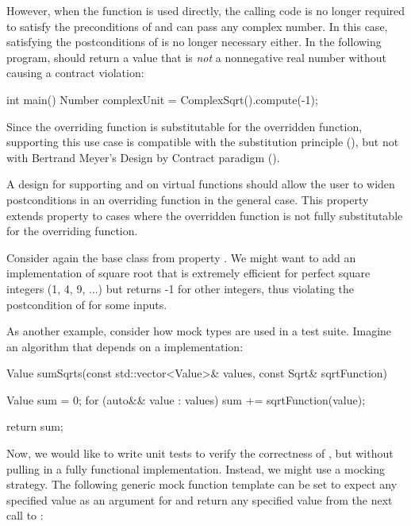 However, when the function  is used directly, the calling code is no longer required to satisfy the preconditions of  and can pass any complex number. In this case, satisfying the postconditions of  is no longer necessary either. In the following program,  should return a value that is \emph{not} a nonnegative real number without causing a contract violation:

\begin{codeblock}
int main() {
  Number complexUnit = ComplexSqrt().compute(-1);
}
\end{codeblock}

Since the overriding function is substitutable for the overridden function, supporting this use case is compatible with the substitution principle (), but not with Bertrand Meyer's Design by Contract paradigm ().


A design for supporting  and  on virtual functions should allow the user to widen postconditions in an overriding function in the general case. This property extends property  to cases where the overridden function is not fully substitutable for the overriding function. 

Consider again the base class  from property . We might want to add an implementation of square root  that is extremely efficient for perfect square integers (1, 4, 9, ...) but returns -1 for other integers, thus violating the postcondition of  for some inputs.

As another example, consider how mock types are used in a test suite. Imagine an algorithm that depends on a  implementation:

\begin{codeblock}
Value sumSqrts(const std::vector<Value>& values, const Sqrt& sqrtFunction) {
  Value sum = 0;
  for (auto&& value : values)
    sum += sqrtFunction(value);
    
  return sum;
}
\end{codeblock}

Now, we would like to write unit tests to verify the correctness of , but without pulling in a fully functional  implementation. Instead, we might use a mocking strategy. The following generic mock function template can be set to expect any specified value as an argument for and return any specified value from the next call to :

